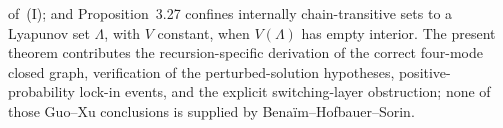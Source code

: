 of~(I); and Proposition~3.27 confines internally chain-transitive sets to a Lyapunov set \(\Lambda\), with \(V\) constant, when \(V(\Lambda)\) has empty interior. The present theorem contributes the recursion-specific derivation of the correct four-mode closed graph, verification of the perturbed-solution hypotheses, positive-probability lock-in events, and the explicit switching-layer obstruction; none of those Guo--Xu conclusions is supplied by Benaïm--Hofbauer--Sorin.